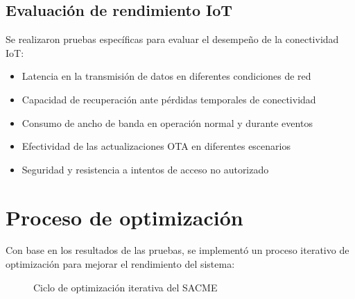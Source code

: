 \documentclass{report}          %
\newcommand{\shortname}     {SACME}
\begin{document}
            \subsection{Evaluación de rendimiento IoT}
                Se realizaron pruebas específicas para evaluar el desempeño de la conectividad IoT:

                \begin{itemize}
                    \item Latencia en la transmisión de datos en diferentes condiciones de red
                    \item Capacidad de recuperación ante pérdidas temporales de conectividad
                    \item Consumo de ancho de banda en operación normal y durante eventos
                    \item Efectividad de las actualizaciones OTA en diferentes escenarios
                    \item Seguridad y resistencia a intentos de acceso no autorizado
                \end{itemize}

        \section{Proceso de optimización}
            Con base en los resultados de las pruebas, se implementó un proceso iterativo de optimización para mejorar el rendimiento del sistema:

            \begin{figure}[H]
                \centering
                \caption{Ciclo de optimización iterativa del \shortname}
            \end{figure}
            
\end{document}
